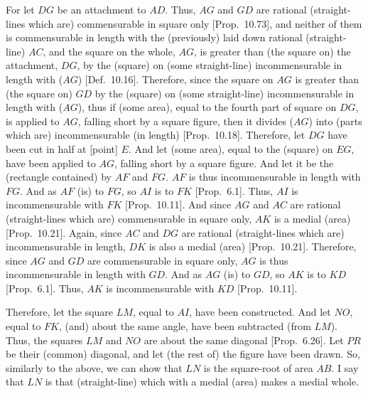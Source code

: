 \begin{Parallel}{}{}
{For let $DG$ be an attachment to $AD$. Thus, $AG$ and $GD$ are rational (straight-lines which are) commensurable in square only [Prop.~10.73], and neither of them is
commensurable in length with the (previously) laid down rational (straight-line) $AC$, and the square on the whole, $AG$, is greater than (the square on)
the attachment, $DG$, by the (square) on (some straight-line)
incommensurable in length with ($AG$) [Def.~10.16]. Therefore, since the square on $AG$
is greater than (the square on) $GD$ by the (square) on (some straight-line)
incommensurable in length with ($AG$), thus if (some area), equal to
the fourth part of square on $DG$, is applied to $AG$, falling short
by a square figure, then it divides ($AG$) into (parts which are) incommensurable
(in length) [Prop.~10.18]. Therefore, let $DG$ have been cut in  half at [point] $E$. And let (some area), equal to the
(square) on $EG$, have been applied to $AG$, falling short by a square figure.
And let it be the (rectangle contained) by $AF$ and $FG$. $AF$ is
thus incommensurable in length with $FG$. And as $AF$ (is) to $FG$,
so $AI$ is to $FK$ [Prop.~6.1].  Thus, $AI$
is incommensurable with $FK$ [Prop.~10.11]. 
And since $AG$ and $AC$ are rational (straight-lines which are)
commensurable in square only, $AK$ is a medial (area) [Prop.~10.21]. Again, since $AC$ and $DG$
are rational (straight-lines which are) incommensurable in length, $DK$
is also a medial (area) [Prop.~10.21]. Therefore,
since $AG$ and $GD$ are commensurable in square only,  $AG$
is thus incommensurable in length with $GD$. And as $AG$ (is) to $GD$,
so $AK$ is to $KD$ [Prop.~6.1]. Thus, $AK$
is incommensurable with $KD$ [Prop.~10.11].

Therefore, let the square $LM$, equal to $AI$, have been constructed.
And let $NO$, equal to $FK$, (and) about the same angle, have been subtracted (from $LM$). Thus, the squares $LM$ and $NO$ are about the
same diagonal [Prop.~6.26]. 
Let $PR$ be their (common) diagonal, and let (the rest of) the figure have been drawn.
So, similarly to the above, we can show that $LN$ is the square-root of
area $AB$. I say that $LN$ is  that (straight-line) which with a medial (area) makes a medial whole.

}
\end{Parallel}
